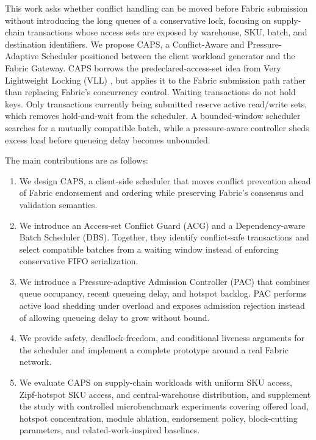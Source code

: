\documentclass[fleqn,10pt,lineno]{wlpeerj}
\begin{document}
This work asks whether conflict handling can be moved before Fabric submission without introducing the long queues of a conservative lock, focusing on supply-chain transactions whose access sets are exposed by warehouse, SKU, batch, and destination identifiers. We propose CAPS, a Conflict-Aware and Pressure-Adaptive Scheduler positioned between the client workload generator and the Fabric Gateway. CAPS borrows the predeclared-access-set idea from Very Lightweight Locking (VLL) \citep{ren2015vll}, but applies it to the Fabric submission path rather than replacing Fabric's concurrency control. Waiting transactions do not hold keys. Only transactions currently being submitted reserve active read/write sets, which removes hold-and-wait from the scheduler. A bounded-window scheduler searches for a mutually compatible batch, while a pressure-aware controller sheds excess load before queueing delay becomes unbounded.

The main contributions are as follows:

\begin{enumerate}[noitemsep]
  \item We design CAPS, a client-side scheduler that moves conflict prevention ahead of Fabric endorsement and ordering while preserving Fabric's consensus and validation semantics.
  \item We introduce an Access-set Conflict Guard (ACG) and a Dependency-aware Batch Scheduler (DBS). Together, they identify conflict-safe transactions and select compatible batches from a waiting window instead of enforcing conservative FIFO serialization.
  \item We introduce a Pressure-adaptive Admission Controller (PAC) that combines queue occupancy, recent queueing delay, and hotspot backlog. PAC performs active load shedding under overload and exposes admission rejection instead of allowing queueing delay to grow without bound.
  \item We provide safety, deadlock-freedom, and conditional liveness arguments for the scheduler and implement a complete prototype around a real Fabric network.
  \item We evaluate CAPS on supply-chain workloads with uniform SKU access, Zipf-hotspot SKU access, and central-warehouse distribution, and supplement the study with controlled microbenchmark experiments covering offered load, hotspot concentration, module ablation, endorsement policy, block-cutting parameters, and related-work-inspired baselines.
\end{enumerate}
\end{document}
